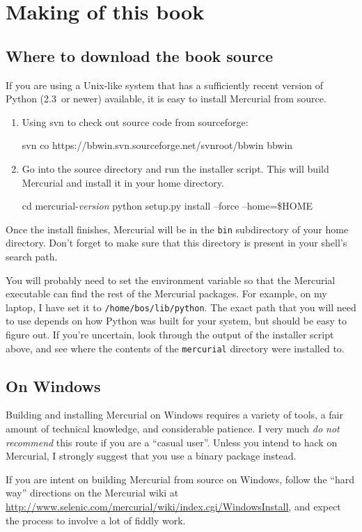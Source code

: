 \chapter{Making of this book}
\label{chap:bookmaking}

\section{Where to download the book source}
\label{sec:srcinstall:unixlike}

If you are using a Unix-like system that has a sufficiently recent
version of Python (2.3~or newer) available, it is easy to install
Mercurial from source.
\begin{enumerate}
\item Using svn to check out source code from sourceforge:
  \begin{codesample4}
      svn co https://bbwin.svn.sourceforge.net/svnroot/bbwin bbwin
  \end{codesample4}
\item Go into the source directory and run the installer script.  This
  will build Mercurial and install it in your home directory.
  \begin{codesample4}
    cd mercurial-\emph{version}
    python setup.py install --force --home=\$HOME
  \end{codesample4}
\end{enumerate}
Once the install finishes, Mercurial will be in the \texttt{bin}
subdirectory of your home directory.  Don't forget to make sure that
this directory is present in your shell's search path.

You will probably need to set the  environment
variable so that the Mercurial executable can find the rest of the
Mercurial packages.  For example, on my laptop, I have set it to
\texttt{/home/bos/lib/python}.  The exact path that you will need to
use depends on how Python was built for your system, but should be
easy to figure out.  If you're uncertain, look through the output of
the installer script above, and see where the contents of the
\texttt{mercurial} directory were installed to.

\section{On Windows}

Building and installing Mercurial on Windows requires a variety of
tools, a fair amount of technical knowledge, and considerable
patience.  I very much \emph{do not recommend} this route if you are a
``casual user''.  Unless you intend to hack on Mercurial, I strongly
suggest that you use a binary package instead.

If you are intent on building Mercurial from source on Windows, follow
the ``hard way'' directions on the Mercurial wiki at
\url{http://www.selenic.com/mercurial/wiki/index.cgi/WindowsInstall},
and expect the process to involve a lot of fiddly work.

